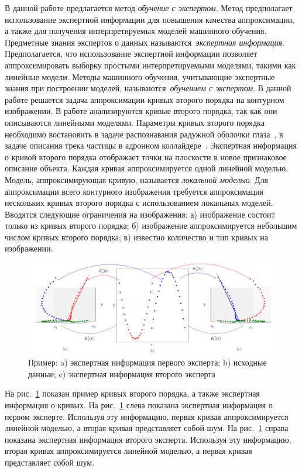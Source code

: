\documentclass[12pt]{a&t}
\begin{document}
В данной работе предлагается метод \textit{обучение с экспертом}.
Метод предполагает использование экспертной информации для повышения качества аппроксимации, а также для получения интерпретируемых моделей машинного обучения.
Предметные знания экспертов о данных называются~\textit{экспертная информация}.
Предполагается, что использование экспертной информации позволяет аппроксимировать выборку простыми интерпретируемыми моделями, такими как линейные модели. Методы машинного обучения, учитывающие экспертные знания при построении моделей, называются~\textit{обучением с экспертом}.
В данной работе решается задача аппроксимации кривых второго порядка на контурном изображении.
В работе анализируются кривые второго порядка, так как они описываются линейными моделями. Параметры кривых второго порядка необходимо востановить в задаче распознавания радужной оболочки глаза~\cite{Matveev2010, Matveev2014, Bowyer2010}, в задаче описания трека частицы в адронном коллайдере~\cite{Dalila2018}.
Экспертная информация о кривой второго порядка отображает точки на плоскости в новое признаковое описание объекта. 
Каждая кривая аппроксимируется одной линейной моделью.
Модель, аппроксимирующая кривую, называется \textit{локальной моделью}.
Для аппроксимации всего контурного изображения требуется аппроксимация нескольких кривых второго порядка с использованием локальных моделей.
Вводятся следующие ограничения на изображения: а) изображение состоит только из кривых второго порядка; б) изображение аппроксимируется небольшим числом кривых второго порядка; в) известно количество и тип кривых на изображении.

\begin{figure}[h!]
  \includegraphics[width=\textwidth]{explanation}
  \caption {Пример: a) экспертная информация первого эксперта; b) исходные данные; c) экспертная информация второго эксперта}
  \label{intro:fig2}
\end{figure}

На рис.~\ref{intro:fig2} показан пример кривых второго порядка, а также экспертная информация о кривых. На рис.~\ref{intro:fig2} слева показана экспертная информация о первом эксперте. Используя эту информацию, первая кривая аппроксимируется линейной моделью, а вторая кривая представляет собой шум. На рис.~\ref{intro:fig2} справа показана экспертная информация второго эксперта. Используя эту информацию, вторая кривая аппроксимируется линейной моделью, а первая кривая представляет собой шум.
\end{document}
